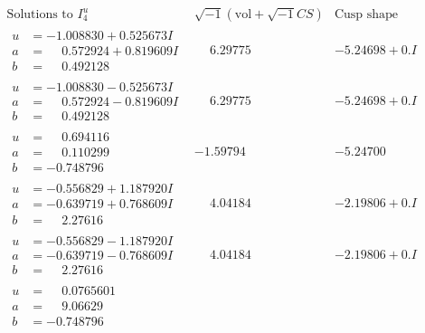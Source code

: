 \documentclass[1p]{elsarticle_modified}
\theoremstyle{definition}
\newcommand{\I}{\sqrt{-1}}
\begin{document}
$$\begin{array}{c|c|c}  
\text{Solutions to }I^u_{4}& \I (\text{vol} + \sqrt{-1}CS) & \text{Cusp shape}\\
 \hline 
\begin{aligned}
u &= -1.008830 + 0.525673 I \\
a &= \phantom{-}0.572924 + 0.819609 I \\
b &= \phantom{-}0.492128\phantom{ +0.000000I}\end{aligned}
 & \phantom{-}6.29775\phantom{ +0.000000I} & -5.24698 + 0. I\phantom{ +0.000000I} \\ \hline\begin{aligned}
u &= -1.008830 - 0.525673 I \\
a &= \phantom{-}0.572924 - 0.819609 I \\
b &= \phantom{-}0.492128\phantom{ +0.000000I}\end{aligned}
 & \phantom{-}6.29775\phantom{ +0.000000I} & -5.24698 + 0. I\phantom{ +0.000000I} \\ \hline\begin{aligned}
u &= \phantom{-}0.694116\phantom{ +0.000000I} \\
a &= \phantom{-}0.110299\phantom{ +0.000000I} \\
b &= -0.748796\phantom{ +0.000000I}\end{aligned}
 & -1.59794\phantom{ +0.000000I} & -5.24700\phantom{ +0.000000I} \\ \hline\begin{aligned}
u &= -0.556829 + 1.187920 I \\
a &= -0.639719 + 0.768609 I \\
b &= \phantom{-}2.27616\phantom{ +0.000000I}\end{aligned}
 & \phantom{-}4.04184\phantom{ +0.000000I} & -2.19806 + 0. I\phantom{ +0.000000I} \\ \hline\begin{aligned}
u &= -0.556829 - 1.187920 I \\
a &= -0.639719 - 0.768609 I \\
b &= \phantom{-}2.27616\phantom{ +0.000000I}\end{aligned}
 & \phantom{-}4.04184\phantom{ +0.000000I} & -2.19806 + 0. I\phantom{ +0.000000I} \\ \hline\begin{aligned}
u &= \phantom{-}0.0765601\phantom{ +0.000000I} \\
a &= \phantom{-}9.06629\phantom{ +0.000000I} \\
b &= -0.748796\phantom{ +0.000000I}\end{aligned}

\end{array}$$
\end{document}
